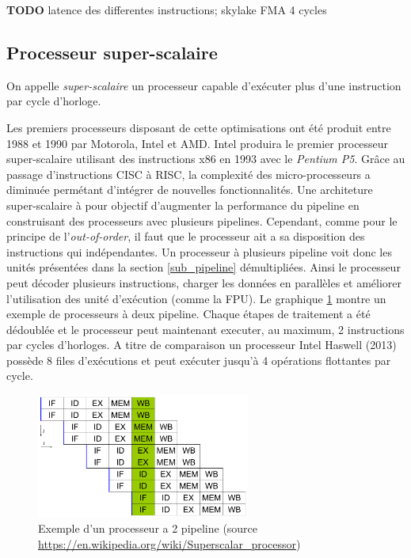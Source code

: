 \textbf{TODO} latence des differentes instructions; skylake FMA 4 cycles %


\subsection{Processeur super-scalaire}
\begin{fancyquotes}
On appelle \textit{super-scalaire} un processeur capable d'exécuter plus d'une instruction par cycle d'horloge. \cite{smith1995microarchitecture}
\end{fancyquotes}
Les premiers processeurs disposant de cette optimisations ont été produit entre 1988 et 1990 par Motorola, Intel et AMD. Intel produira le premier processeur super-scalaire utilisant des instructions x86 en 1993 avec le \textit{Pentium P5}. Grâce au passage d'instructions CISC à RISC, la complexité des micro-processeurs a diminuée permétant d'intégrer de nouvelles fonctionnalités. Une architeture super-scalaire à pour objectif d'augmenter la performance du pipeline en construisant des processeurs avec plusieurs pipelines. Cependant, comme pour le principe de l'\textit{out-of-order}, il faut que le processeur ait a sa disposition des instructions qui indépendantes. Un processeur à plusieurs pipeline voit donc les unités présentées dans la section \ref{sub_pipeline} démultipliées.  Ainsi le processeur peut décoder plusieurs instructions, charger les données en parallèles et améliorer l'utilisation des unité d'exécution (comme la FPU). Le graphique \ref{pic_superscalar} montre un exemple de processeurs à deux pipeline. Chaque étapes de traitement a été dédoublée et le processeur peut maintenant executer, au maximum, 2 instructions par cycles d'horloges. A titre de comparaison un processeur Intel Haswell (2013) possède 8 files d'exécutions et peut exécuter jusqu'à 4 opérations flottantes par cycle.

\begin{figure}
    \center
    \includegraphics[width=7cm]{images/Chapitre1/superscalar.png}
    \caption{\label{pic_superscalar} Exemple d'un processeur a 2 pipeline (source \url{https://en.wikipedia.org/wiki/Superscalar_processor}) }
\end{figure}

